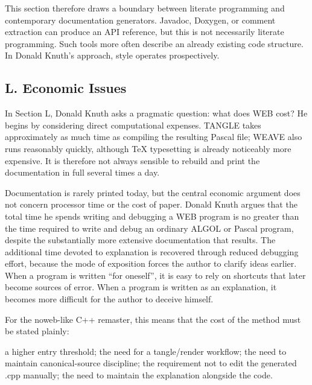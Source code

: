 \documentclass{ZGJournalArticle_2026}
\newenvironment{Shaded}{}{}
\newcommand{\NormalTok}[1]{#1}
\begin{document}
This section therefore draws a boundary between literate programming and
contemporary documentation generators. Javadoc, Doxygen, or comment
extraction can produce an API reference, but this is not necessarily
literate programming. Such tools more often describe an already existing
code structure. In Donald Knuth's approach, style operates
prospectively.

\subsection{L. Economic Issues}\label{l.-economic-issues}

In Section L, Donald Knuth asks a pragmatic question: what does WEB
cost? He begins by considering direct computational expenses. TANGLE
takes approximately as much time as compiling the resulting Pascal file;
WEAVE also runs reasonably quickly, although TeX typesetting is already
noticeably more expensive. It is therefore not always sensible to
rebuild and print the documentation in full several times a day.

Documentation is rarely printed today, but the central economic argument
does not concern processor time or the cost of paper. Donald Knuth
argues that the total time he spends writing and debugging a WEB program
is no greater than the time required to write and debug an ordinary
ALGOL or Pascal program, despite the substantially more extensive
documentation that results. The additional time devoted to explanation
is recovered through reduced debugging effort, because the mode of
exposition forces the author to clarify ideas earlier. When a program is
written ``for oneself'', it is easy to rely on shortcuts that later
become sources of error. When a program is written as an explanation, it
becomes more difficult for the author to deceive himself.

For the noweb-like C++ remaster, this means that the cost of the method
must be stated plainly:

\begin{Shaded}
\begin{Highlighting}[]
\NormalTok{a higher entry threshold;}
\NormalTok{the need for a tangle/render workflow;}
\NormalTok{the need to maintain canonical{-}source discipline;}
\NormalTok{the requirement not to edit the generated .cpp manually;}
\NormalTok{the need to maintain the explanation alongside the code.}
\end{Highlighting}
\end{Shaded}
\end{document}
